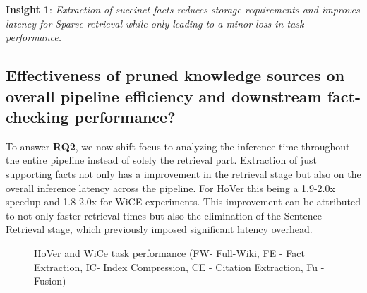 \noindent \textbf{Insight 1}: \textit{
Extraction of succinct facts reduces storage requirements and improves latency for Sparse retrieval while only leading to a minor loss in task performance.}
\vspace{-2em}

\subsection{Effectiveness of pruned knowledge sources on overall pipeline efficiency and downstream fact-checking performance?}
To answer \textbf{RQ2}, we now shift focus to analyzing the inference time throughout the entire pipeline instead of solely the retrieval part. Extraction of just supporting facts not only has a improvement in the retrieval stage but also on the overall inference latency across the pipeline. For HoVer this being a 1.9-2.0x speedup and 1.8-2.0x for WiCE experiments. This improvement can be attributed to not only faster retrieval times but also the elimination of the Sentence Retrieval stage, which previously imposed significant latency overhead. 

%


\begin{figure*}[hbt!]
    \begin{subfigure}{.5\textwidth}
        
    \end{subfigure}
        \begin{subfigure}{.5\textwidth}
    

    \end{subfigure}
    \caption{HoVer and WiCe task performance (FW- Full-Wiki, FE - Fact Extraction, IC- Index Compression, CE - Citation Extraction, Fu - Fusion)}
    \label{fig:performance_plot}
    \end{figure*}

